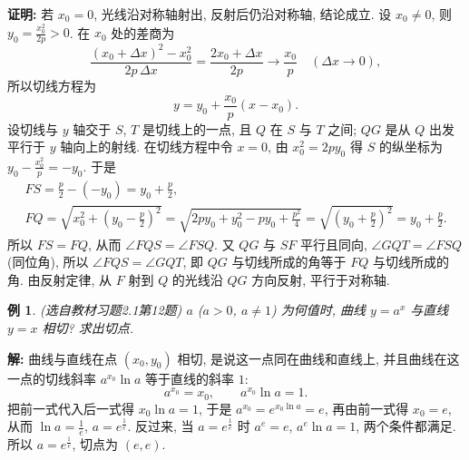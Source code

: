 \documentclass[UTF8,openany]{ctexbook}
\theoremstyle{chinesetextbook}
\newtheorem{example}{例}[section]
\newenvironment{cnproof}{\par\indent\textbf{证明:} \ignorespaces}{\par}
\newenvironment{cnsolution}{\par\indent\textbf{解:} \ignorespaces}{\par}
\begin{document}
\begin{center}
\end{center}
\begin{cnproof}
若 $x_0=0$, 光线沿对称轴射出, 反射后仍沿对称轴, 结论成立. 设 $x_0\ne0$, 则 $\displaystyle y_0=\frac{x_0^2}{2p}>0$. 在 $x_0$ 处的差商为
\[
\frac{(x_0+\Delta x)^2-x_0^2}{2p\,\Delta x}=\frac{2x_0+\Delta x}{2p}\to\frac{x_0}p\quad(\Delta x\to0),
\]
所以切线方程为
\[
y=y_0+\frac{x_0}p(x-x_0).
\]
设切线与 $y$ 轴交于 $S$, $T$ 是切线上的一点, 且 $Q$ 在 $S$ 与 $T$ 之间; $QG$ 是从 $Q$ 出发平行于 $y$ 轴向上的射线. 在切线方程中令 $x=0$, 由 $x_0^2=2py_0$ 得 $S$ 的纵坐标为 $\displaystyle y_0-\frac{x_0^2}p=-y_0$. 于是
\[
\begin{gathered}
FS=\frac p2-(-y_0)=y_0+\frac p2,\\
FQ=\sqrt{x_0^2+\left(y_0-\frac p2\right)^2}=\sqrt{2py_0+y_0^2-py_0+\frac{p^2}4}=\sqrt{\left(y_0+\frac p2\right)^2}=y_0+\frac p2.
\end{gathered}
\]
所以 $FS=FQ$, 从而 $\angle FQS=\angle FSQ$. 又 $QG$ 与 $SF$ 平行且同向, $\angle GQT=\angle FSQ$ (同位角), 所以 $\angle FQS=\angle GQT$, 即 $QG$ 与切线所成的角等于 $FQ$ 与切线所成的角. 由反射定律, 从 $F$ 射到 $Q$ 的光线沿 $QG$ 方向反射, 平行于对称轴.
\end{cnproof}
\begin{example}\label{ex:c2-h1-12}
\textnormal{(选自教材习题2.1第12题)} $a$ ($a>0$, $a\ne1$) 为何值时, 曲线 $y=a^x$ 与直线 $y=x$ 相切? 求出切点.
\end{example}
\begin{cnsolution}
曲线与直线在点 $(x_0,y_0)$ 相切, 是说这一点同在曲线和直线上, 并且曲线在这一点的切线斜率 $a^{x_0}\ln a$ 等于直线的斜率 $1$:
\[
a^{x_0}=x_0,\qquad a^{x_0}\ln a=1.
\]
把前一式代入后一式得 $x_0\ln a=1$, 于是 $a^{x_0}=e^{x_0\ln a}=e$, 再由前一式得 $x_0=e$, 从而 $\displaystyle\ln a=\frac1e$, $a=e^{\frac1e}$. 反过来, 当 $a=e^{\frac1e}$ 时 $a^e=e$, $a^e\ln a=1$, 两个条件都满足. 所以 $a=e^{\frac1e}$, 切点为 $(e,e)$.
\end{cnsolution}
\end{document}
